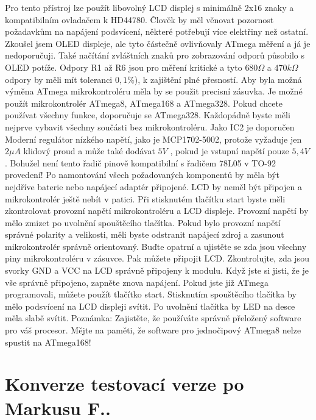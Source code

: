 Pro tento přístroj lze použít libovolný LCD displej s minimálně 2x16 znaky a kompatibilním
ovladačem k HD44780.
Člověk by měl věnovat pozornost požadavkům na napájení podsvícení, některé potřebují 
více elektřiny než ostatní.
Zkoušel jsem OLED displeje, ale tyto částečně ovlivňovaly ATmega měření
a já je nedoporučuji. Také načítání zvláštních znaků pro zobrazování odporů působilo
s OLED potíže.
Odpory R1 až R6 jsou pro měření kritické a tyto \(680\Omega\) a \(470k\Omega\) odpory
by měli mít toleranci \(0,1\%\)), k zajištění plné přesností.
Aby byla možná výměna ATmega mikrokontroléru měla by se použit precisní zásuvka.
Je možné použít mikrokontrolér ATmega8, ATmega168 a ATmega328.
Pokud chcete používat všechny funkce, doporučuje se ATmega328.
Každopádně byste měli nejprve vybavit všechny součásti bez mikrokontroléru.
Jako IC2 je doporučen Moderní regulátor nízkého napětí, jako je MCP1702-5002,
protože vyžaduje jen \(2\mu A\) klidový proud a může také dodávat \(5V\) , 
pokud je vstupní napětí pouze \(5,4V\) .
Bohužel není tento řadič pinově kompatibilní s řadičem 78L05 v TO-92 provedení!
Po namontování všech požadovaných komponentů by měla být nejdříve baterie 
nebo napájecí adaptér připojené. LCD by neměl být připojen a mikrokontrolér ještě
nebít v patici.
Při stisknutém tlačítku start byste měli zkontrolovat provozní napětí mikrokontroléru a LCD displeje.
Provozní napětí by mělo zmizet po uvolnění spouštěcího tlačítka.
Pokud bylo provozní napětí správné polarity a velikosti,
měli byste odstranit napájecí zdroj a zasunout mikrokontrolér správně orientovaný.
Buďte opatrní a ujistěte se zda jsou všechny piny mikrokontroléru v zásuvce.
Pak můžete připojit LCD. Zkontrolujte, zda jsou svorky GND a VCC na LCD správně připojeny k modulu.
Když jste si jisti, že je vše správně připojeno, zapněte znova napájení.
Pokud jste již ATmega programovali, můžete použít tlačítko start.
Stisknutím spouštěcího tlačítka by mělo podsvícení na LCD displeji svítit.
Po uvolnění tlačítka by LED na desce měla slabě svítit.
Poznámka: Zajistěte, že používáte správně přeložený software pro váš procesor.
Mějte na paměti, že software pro jednočipový ATmega8 nelze spustit na ATmega168!

\section{Konverze testovací verze po Markusu F..}
\label{sec:change_markus}

